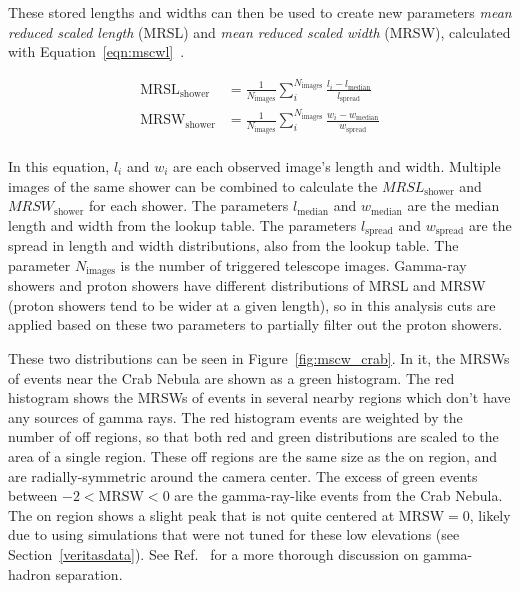 These stored lengths and widths can then be used to create new parameters \textit{mean reduced scaled length} (MRSL) and \textit{mean reduced scaled width} (MRSW), calculated with Equation~\ref{eqn:mscwl}~\cite{mrswl_technique}.

\begin{equation}\label{eqn:mscwl}
  \begin{split}
    \textrm{MRSL}_{\textrm{shower}} & = \frac{1}{N_{\textrm{images}}} \sum_{i}^{N_{\textrm{images}}} \frac{l_{i}-l_{\textrm{median}}}{l_{\textrm{spread}}} \\
    \textrm{MRSW}_{\textrm{shower}} & = \frac{1}{N_{\textrm{images}}} \sum_{i}^{N_{\textrm{images}}} \frac{w_{i}-w_{\textrm{median}}}{w_{\textrm{spread}}} \\
  \end{split}
\end{equation}

In this equation, $l_{i}$ and $w_{i}$ are each observed image's length and width.
Multiple images of the same shower can be combined to calculate the $MRSL_{\textrm{shower}}$ and $MRSW_{\textrm{shower}}$ for each shower.
The parameters $l_{\textrm{median}}$ and $w_{\textrm{median}}$ are the median length and width from the lookup table.
The parameters $l_{\textrm{spread}}$ and $w_{\textrm{spread}}$ are the spread in length and width distributions, also from the lookup table.
The parameter $N_{\textrm{images}}$ is the number of triggered telescope images.
Gamma-ray showers and proton showers have different distributions of MRSL and MRSW (proton showers tend to be wider at a given length), so in this analysis cuts are applied based on these two parameters to partially filter out the proton showers.

These two distributions can be seen in Figure~\ref{fig:mscw_crab}.
In it, the MRSWs of events near the Crab Nebula are shown as a green histogram.
The red histogram shows the MRSWs of events in several nearby regions which don't have any sources of gamma rays.
The red histogram events are weighted by the number of off regions, so that both red and green distributions are scaled to the area of a single region.
These off regions are the same size as the on region, and are radially-symmetric around the camera center.
The excess of green events between $-2<\mathrm{MRSW}<0$ are the gamma-ray-like events from the Crab Nebula.
The on region shows a slight peak that is not quite centered at $\mathrm{MRSW}=0$, likely due to using simulations that were not tuned for these low elevations (see Section~\ref{veritasdata}).
See Ref.~\cite{Krause2017} for a more thorough discussion on gamma-hadron separation.

